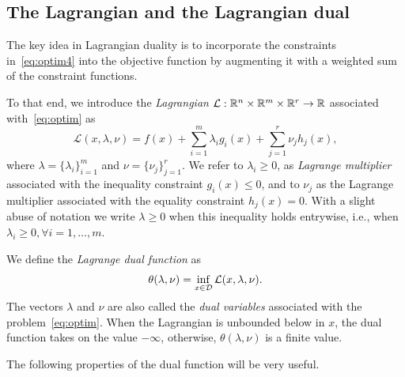 \subsection{The Lagrangian and the Lagrangian dual}


The key idea in Lagrangian duality is to incorporate the constraints in~\eqref{eq:optim4} into the objective function by augmenting it with a weighted sum of the constraint functions.

To that end, we introduce the {\em Lagrangian} ${\mathcal L}: \mathbb{R}^n \times \mathbb{R}^m\times \mathbb{R}^r \to \mathbb{R}$ associated with~\eqref{eq:optim} as
$$
\mathcal{L}(x,\lambda,\nu)
= f(x) + \sum_{i=1}^m \lambda_i g_i(x)
+ \sum_{j=1}^r \nu_j h_j(x),
$$
where $\lambda = \{\lambda_i\}_{i=1}^m$ and $\nu = \{\nu_j\}_{j=1}^r$.
We refer to $\lambda_i\ge 0$, as {\em Lagrange multiplier} associated with the inequality constraint $g_i(x)\le 0$, and to $\nu_j$ as the Lagrange
multiplier associated with the  equality constraint $h_j(x)=0$. With a slight abuse of notation we write 
$\lambda \ge 0$ when this inequality holds entrywise, i.e., when $\lambda_i \ge 0, \forall i=1,\dots,m$.


We define the {\em Lagrange dual function} as
$$
\theta(\lambda,\nu) = \inf_{x\in {\mathcal D}} \mathcal{L}(x,\lambda,\nu).
$$
The vectors $\lambda$ and $\nu$ are also
called the {\em dual variables} associated with the problem~\eqref{eq:optim}.
When the Lagrangian is unbounded below in $x$, the dual function takes on the
value $-\infty$, otherwise, $\theta(\lambda,\nu)$ is a
finite value. 

The following properties of the dual function will be very useful.

